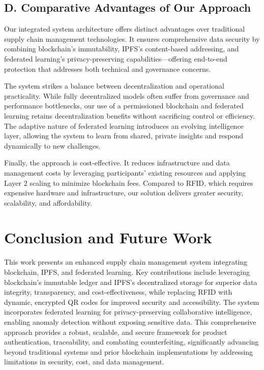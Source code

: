 \documentclass[conference]{IEEEtran}
\begin{document}
\subsection*{D. Comparative Advantages of Our Approach}
Our integrated system architecture offers distinct advantages over traditional supply chain management technologies. It ensures comprehensive data security by combining blockchain’s immutability, IPFS’s content-based addressing, and federated learning’s privacy-preserving capabilities—offering end-to-end protection that addresses both technical and governance concerns.

The system strikes a balance between decentralization and operational practicality. While fully decentralized models often suffer from governance and performance bottlenecks, our use of a permissioned blockchain and federated learning retains decentralization benefits without sacrificing control or efficiency. The adaptive nature of federated learning introduces an evolving intelligence layer, allowing the system to learn from shared, private insights and respond dynamically to new challenges.

Finally, the approach is cost-effective. It reduces infrastructure and data management costs by leveraging participants’ existing resources and applying Layer 2 scaling to minimize blockchain fees. Compared to RFID, which requires expensive hardware and infrastructure, our solution delivers greater security, scalability, and affordability.

\section{Conclusion and Future Work}

This work presents an enhanced supply chain management system integrating blockchain, IPFS, and federated learning. Key contributions include leveraging blockchain's immutable ledger and IPFS's decentralized storage for superior data integrity, transparency, and cost-effectiveness, while replacing RFID with dynamic, encrypted QR codes for improved security and accessibility. The system incorporates federated learning for privacy-preserving collaborative intelligence, enabling anomaly detection without exposing sensitive data. This comprehensive approach provides a robust, scalable, and secure framework for product authentication, traceability, and combating counterfeiting, significantly advancing beyond traditional systems and prior blockchain implementations by addressing limitations in security, cost, and data management.
\end{document}
